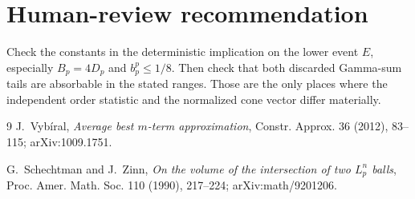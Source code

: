 \documentclass[11pt]{article}
\begin{document}
\section*{Human-review recommendation}

Check the constants in the deterministic implication on the lower event $E$,
especially $B_p=4D_p$ and $b_p^p\leq1/8$.  Then check that both discarded
Gamma-sum tails are absorbable in the stated ranges.  Those are the only
places where the independent order statistic and the normalized cone vector
differ materially.

\begin{sloppypar}
\raggedright
\begin{thebibliography}{9}
J.~Vyb\'iral,
\emph{Average best $m$-term approximation},
Constr. Approx. 36 (2012), 83--115; arXiv:1009.1751.

G.~Schechtman and J.~Zinn,
\emph{On the volume of the intersection of two $L_p^n$ balls},
Proc. Amer. Math. Soc. 110 (1990), 217--224; arXiv:math/9201206.
\end{thebibliography}
\end{sloppypar}
\end{document}
